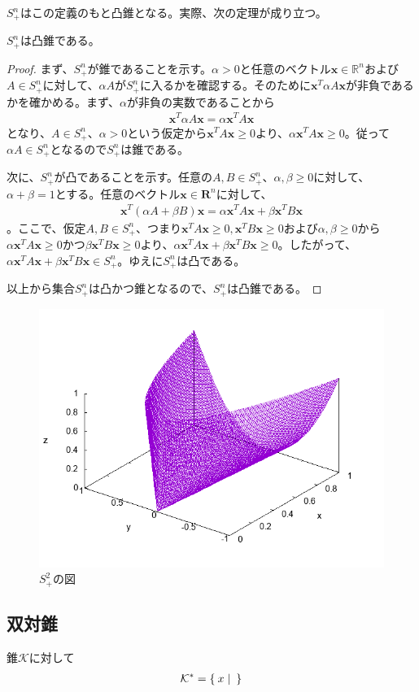 $S_+^n$はこの定義のもと凸錐となる。実際、次の定理が成り立つ。
\begin{theorem*}
  $S_+^n$は凸錐である。
\end{theorem*}
\begin{proof}
  まず、$S_+^n$が錐であることを示す。$\alpha > 0$と任意のベクトル$\mathbf{x} \in \mathbb{R}^n$および$A \in S_+^n$に対して、$\alpha A$が$S_+^n$に入るかを確認する。そのために$\mathbf{x}^T \alpha A \mathbf{x}$が非負であるかを確かめる。まず、$\alpha$が非負の実数であることから
  \begin{align*}
    \mathbf{x}^T \alpha A \mathbf{x} = \alpha \mathbf{x}^T A \mathbf{x}
  \end{align*}
  となり、$A \in S_+^n$、$\alpha > 0$という仮定から$\mathbf{x}^T A \mathbf{x} \geq 0$より、$\alpha \mathbf{x}^T A \mathbf{x} \geq 0$。従って$\alpha A \in S_+^n$となるので$S_+^n$は錐である。

  次に、$S_+^n$が凸であることを示す。任意の$A, B \in S_+^n$、$\alpha, \beta \geq 0$に対して、$\alpha + \beta = 1$とする。任意のベクトル$\mathbf{x} \in \mathbf{R}^n$に対して、
  \begin{align*}
    \mathbf{x}^T \left(\alpha A + \beta B\right) \mathbf{x} = \alpha \mathbf{x}^T A \mathbf{x} + \beta \mathbf{x}^T B \mathbf{x}
  \end{align*}
  。ここで、仮定$A, B \in S_+^n$、つまり$\mathbf{x}^T A \mathbf{x} \geq 0, \mathbf{x}^T B \mathbf{x} \geq 0$および$\alpha, \beta \geq 0$から$\alpha \mathbf{x}^T A \mathbf{x} \geq 0$かつ$\beta \mathbf{x}^T B \mathbf{x} \geq 0$より、$\alpha \mathbf{x}^T A \mathbf{x} + \beta \mathbf{x}^T B \mathbf{x} \geq 0$。したがって、$\alpha \mathbf{x}^T A \mathbf{x} + \beta \mathbf{x}^T B \mathbf{x} \in S_+^n$。ゆえに$S_+^n$は凸である。

  以上から集合$S_+^n$は凸かつ錐となるので、$S_+^n$は凸錐である。
\end{proof}
\begin{figure}
  \includegraphics{PSDcone.png}
  \caption[]{$S_+^2$の図}
\end{figure}

\subsection{双対錐}
錐$\mathcal{K}$に対して
\begin{align*}
  \mathcal{K}^* = \Set{x | }
\end{align*}
